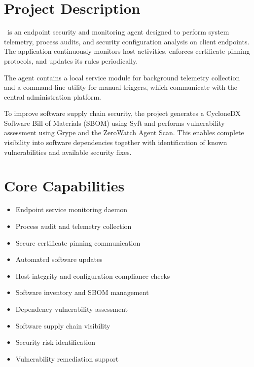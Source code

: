 \vspace{0.4cm}


\section{Project Description}

\ProjectName\ is an endpoint security and monitoring agent designed to perform system telemetry, process audits, and security configuration analysis on client endpoints. The application continuously monitors host activities, enforces certificate pinning protocols, and updates its rules periodically.

The agent contains a local service module for background telemetry collection and a command-line utility for manual triggers, which communicate with the central administration platform.

To improve software supply chain security, the project generates a CycloneDX Software Bill of Materials (SBOM) using Syft and performs vulnerability assessment using Grype and the ZeroWatch Agent Scan. This enables complete visibility into software dependencies together with identification of known vulnerabilities and available security fixes.

\vspace{0.4cm}


\section{Core Capabilities}

\begin{itemize}
\item Endpoint service monitoring daemon
\item Process audit and telemetry collection
\item Secure certificate pinning communication
\item Automated software updates
\item Host integrity and configuration compliance checks
\item Software inventory and SBOM management
\item Dependency vulnerability assessment
\item Software supply chain visibility
\item Security risk identification
\item Vulnerability remediation support
\end{itemize}

